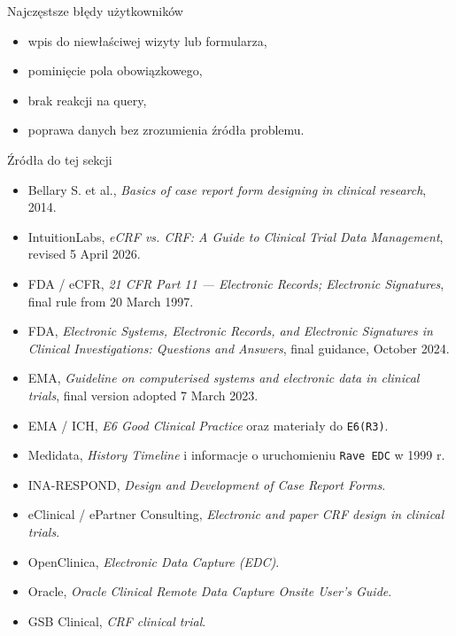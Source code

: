 \begin{frame}{Najczęstsze błędy użytkowników}
  \begin{itemize}
    \item wpis do niewłaściwej wizyty lub formularza,
    \item pominięcie pola obowiązkowego,
    \item brak reakcji na query,
    \item poprawa danych bez zrozumienia źródła problemu.
  \end{itemize}
\end{frame}

\begin{frame}{Źródła do tej sekcji}
  \footnotesize
  \begin{itemize}
    \item Bellary S. et al., \textit{Basics of case report form designing in clinical research}, 2014.
    \item IntuitionLabs, \textit{eCRF vs. CRF: A Guide to Clinical Trial Data Management}, revised 5 April 2026.
    \item FDA / eCFR, \textit{21 CFR Part 11 — Electronic Records; Electronic Signatures}, final rule from 20 March 1997.
    \item FDA, \textit{Electronic Systems, Electronic Records, and Electronic Signatures in Clinical Investigations: Questions and Answers}, final guidance, October 2024.
    \item EMA, \textit{Guideline on computerised systems and electronic data in clinical trials}, final version adopted 7 March 2023.
    \item EMA / ICH, \textit{E6 Good Clinical Practice} oraz materiały do \texttt{E6(R3)}.
    \item Medidata, \textit{History Timeline} i informacje o uruchomieniu \texttt{Rave EDC} w 1999 r.
    \item INA-RESPOND, \textit{Design and Development of Case Report Forms}.
    \item eClinical / ePartner Consulting, \textit{Electronic and paper CRF design in clinical trials}.
    \item OpenClinica, \textit{Electronic Data Capture (EDC)}.
    \item Oracle, \textit{Oracle Clinical Remote Data Capture Onsite User's Guide}.
    \item GSB Clinical, \textit{CRF clinical trial}.
  \end{itemize}
\end{frame}

